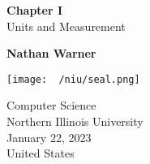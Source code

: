 \documentclass{report}
\title{\Huge{}}
\author{\huge{Nathan Warner}}
\date{\huge{}}
\begin{document}
        \begin{titlepage}
       \begin{center}
           \vspace*{1cm}
    
           \textbf{Chapter I} \\ 
            Units and Measurement
    
           \vspace{0.5cm}
            
                
           \vspace{1.5cm}
    
           \textbf{Nathan Warner}
    
           \vfill
                
                
           \vspace{0.8cm}
         
           \texttt{[image: ~/niu/seal.png]}
                
           Computer Science \\
           Northern Illinois University\\
           January 22, 2023 \\
           United States\\
           
                
       \end{center}
    \end{titlepage}
    \tableofcontents
    \pagebreak 
    \bigbreak \noindent 
\end{document}
